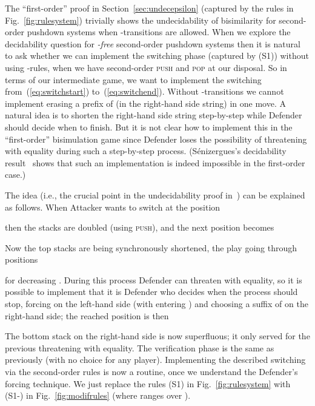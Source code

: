 \documentclass[11pt]{article}
\newcommand{\push}{\textsc{push}\xspace}
\newcommand{\pop}{\textsc{pop}\xspace}
\begin{document}
The ``first-order'' proof in Section~\ref{sec:undecepsilon}
(captured by the rules in Fig.~\ref{fig:rulesystem})
trivially shows the undecidability of bisimilarity for second-order
pushdown systems when 
-transitions are allowed.
When we explore the decidability question for
\emph{-free}
second-order pushdown systems then
it is natural to ask whether
we can implement the switching phase
(captured by (S1))
without using -rules, when
we have second-order \push and \pop at
our disposal.
So in terms of our intermediate game, we want to implement 
the switching from~(\ref{eq:switchstart}) 
to~(\ref{eq:switchend}). 
Without -transitions  we cannot implement erasing 
a prefix of  
(in the right-hand side string) in one move.
A natural idea is to shorten the right-hand side string 
step-by-step while Defender should 
decide when to finish. But it is not clear how 
to implement this in the ``first-order'' 
bisimulation game since Defender 
loses the possibility
of threatening with equality during such a step-by-step process. 
(S\'enizergues's decidability 
result~\cite{Senizergues:SIAM:05} shows that 
such an implementation is
indeed impossible in the first-order case.)

The idea (i.e., the crucial point in the undecidability proof 
in~\cite{DBLP:conf/fsttcs/BroadbentG12}) can be explained as follows.
When Attacker wants to switch at the position

then the stacks are doubled (using \push),
and the next position becomes

Now the top stacks are being synchronously shortened, the play 
going through positions

for decreasing .
During this process
Defender can threaten with equality, so it is
possible to implement that it is Defender who decides when the process should
stop, forcing 
 on the left-hand side (with entering )
and choosing a suffix  of  on the 
right-hand side; the reached position is then

The bottom stack on the right-hand side is now superfluous;
it only served for the previous threatening
with equality.
The verification phase is the same as previously
(with no choice for any player).
Implementing the described switching via the second-order rules 
is now a routine,
once we understand the Defender's forcing technique.
We just replace the rules (S1) in Fig.~\ref{fig:rulesystem}
with (S1-) in Fig.~\ref{fig:modifrules}
(where  ranges over ).
\end{document}
